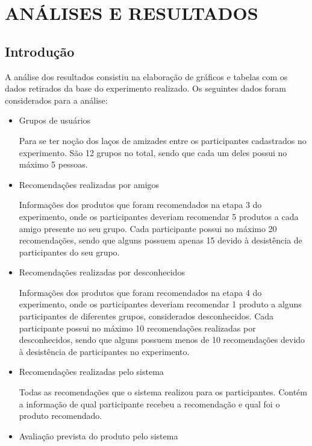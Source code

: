 \chapter{ANÁLISES E RESULTADOS} %
\label{cha:analises_e_resultados}

\section{Introdução}
\label{cha:introducao}

 A análise dos resultados consistiu na elaboração de gráficos e tabelas com os dados retirados da base do experimento realizado. Os seguintes dados foram considerados para a análise:
 
\begin{itemize}
	\item Grupos de usuários
	
	\subitem Para se ter noção dos laços de amizades entre os participantes cadastrados no experimento. São 12 grupos no total, sendo que cada um deles possui no máximo 5 pessoas.
	
	\item Recomendações realizadas por amigos
	
	\subitem Informações dos produtos que foram recomendados na etapa 3 do experimento, onde os participantes deveriam recomendar 5 produtos a cada amigo presente no seu grupo. Cada participante possui no máximo 20 recomendações, sendo que alguns possuem apenas 15 devido à desistência de participantes do seu grupo.
	
	\item Recomendações realizadas por desconhecidos
	
	\subitem Informações dos produtos que foram recomendados na etapa 4 do experimento, onde os participantes deveriam recomendar 1 produto a alguns participantes de diferentes grupos, considerados desconhecidos. Cada participante possui no máximo 10 recomendações realizadas por desconhecidos, sendo que alguns possuem menos de 10 recomendações devido à desistência de participantes no experimento.
	
	\item Recomendações realizadas pelo sistema
	
	\subitem Todas as recomendações que o sistema realizou para os participantes. Contém a informação de qual participante recebeu a recomendação e qual foi o produto recomendado.
	
	\item Avaliação prevista do produto pelo sistema
	

\end{itemize}
